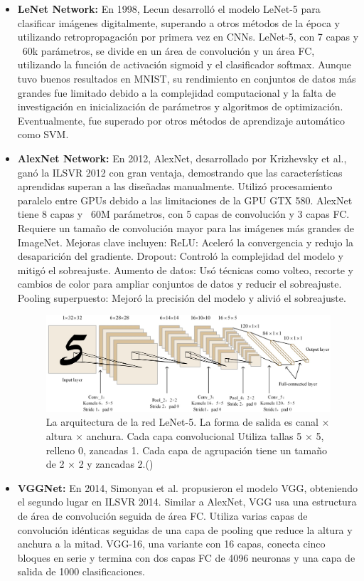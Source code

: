  \begin{itemize}
 	\item \textbf{LeNet Network:} En 1998, Lecun  desarrolló el modelo LeNet-5 para clasificar imágenes digitalmente, superando a otros métodos de la época y utilizando retropropagación por primera vez en CNNs. LeNet-5, con 7 capas y ~60k parámetros, se divide en un área de convolución y un área FC, utilizando la función de activación sigmoid y el clasificador softmax. Aunque tuvo buenos resultados en MNIST, su rendimiento en conjuntos de datos más grandes fue limitado debido a la complejidad computacional y la falta de investigación en inicialización de parámetros y algoritmos de optimización. Eventualmente, fue superado por otros métodos de aprendizaje automático como SVM.
 	\item \textbf{AlexNet Network:} En 2012, AlexNet, desarrollado por Krizhevsky et al., ganó la ILSVR 2012 con gran ventaja, demostrando que las características aprendidas superan a las diseñadas manualmente. Utilizó procesamiento paralelo entre GPUs debido a las limitaciones de la GPU GTX 580. AlexNet tiene 8 capas y ~60M parámetros, con 5 capas de convolución y 3 capas FC. Requiere un tamaño de convolución mayor para las imágenes más grandes de ImageNet. Mejoras clave incluyen:
 	ReLU: Aceleró la convergencia y redujo la desaparición del gradiente.
 	Dropout: Controló la complejidad del modelo y mitigó el sobreajuste.
 	Aumento de datos: Usó técnicas como volteo, recorte y cambios de color para ampliar conjuntos de datos y reducir el sobreajuste.
 	Pooling superpuesto: Mejoró la precisión del modelo y alivió el sobreajuste.
 	

  
   \begin{figure}[H]
  	\begin{center}
  		\includegraphics[width=1\textwidth]{2/figures/cnn3.jpeg}
  		\caption{La arquitectura de la red LeNet-5. La forma de salida es canal × altura × anchura. Cada capa convolucional
  			Utiliza tallas 5 × 5, relleno 0, zancadas 1. Cada capa de agrupación tiene un tamaño de 2 × 2 y zancadas 2.(\cite{tecnica2})}
  	\end{center}
  \end{figure}
  	\item \textbf{VGGNet:} En 2014, Simonyan et al. propusieron el modelo VGG, obteniendo el segundo lugar en ILSVR 2014. Similar a AlexNet, VGG usa una estructura de área de convolución seguida de área FC. Utiliza varias capas de convolución idénticas seguidas de una capa de pooling que reduce la altura y anchura a la mitad. VGG-16, una variante con 16 capas, conecta cinco bloques en serie y termina con dos capas FC de 4096 neuronas y una capa de salida de 1000 clasificaciones.
  	

\end{itemize}
